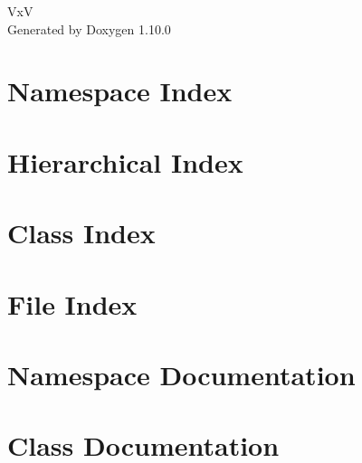 \documentclass[twoside]{book}
\newcommand{\+}{\discretionary{\mbox{\scriptsize$\hookleftarrow$}}{}{}}
\newcommand{\clearemptydoublepage}{%
    \newpage{\pagestyle{empty}\cleardoublepage}%
  }
\begin{document}
  \raggedbottom
    \hypersetup{pageanchor=false,
                bookmarksnumbered=true,
                pdfencoding=unicode
               }
  \begin{titlepage}
  \vspace*{7cm}
  \begin{center}%
  {\Large VxV}\\
  \vspace*{1cm}
  {\large Generated by Doxygen 1.10.0}\\
  \end{center}
  \end{titlepage}
  \clearemptydoublepage
  \tableofcontents
  \clearemptydoublepage
  \hypersetup{pageanchor=true}
\chapter{Namespace Index}

\chapter{Hierarchical Index}

\chapter{Class Index}

\chapter{File Index}

\chapter{Namespace Documentation}


\chapter{Class Documentation}







































\end{document}
